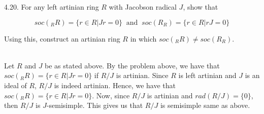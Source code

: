 4.20. For any left artinian ring $R$ with Jacobson radical $J$, show that

$$soc(_RR)=\{r\in R|Jr=0\}\;\;\text{and}\;\;soc(R_R)=\{r\in R|rJ=0\}$$

Using this, construct an artinian ring $R$ in which $soc(_RR)\neq soc(R_R)$.\\

\begin{solution}\renewcommand{\qedsymbol}{}\ \\
    Let $R$ and $J$ be as stated above. By the problem above, we have that $soc(_RR)=\{r\in R|Jr=0\}$ if
    $R/J$ is artinian. Since $R$ is left artinian and $J$ is an ideal of $R$, $R/J$ is indeed artinian.
    Hence, we have that $soc(_RR)=\{r\in R|Jr=0\}$. Now, since $R/J$ is artinian and $rad(R/J)=\{0\}$,
    then $R/J$ is $J$-semisimple. This gives us that $R/J$ is semisimple same as above.

\end{solution}
